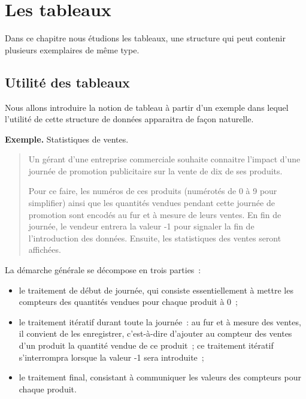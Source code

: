 \chapter{Les tableaux}
\label{chap:tableaux}

	Dans ce chapitre nous étudions les tableaux, une structure qui peut contenir
	plusieurs exemplaires de même type.

	\minitoc
	\clearpage
	\section{Utilité des tableaux}
	
		Nous allons introduire la notion de tableau à partir d’un exemple 
		dans lequel l’utilité de cette structure de données 
		apparaitra de façon naturelle.
	
		\textbf{Exemple.}
		Statistiques de ventes.
		\begin{quote}	
		
			Un gérant d’une entreprise commerciale souhaite connaitre l’impact
			d’une journée de promotion publicitaire sur la vente de dix de ses
			produits.  
			
			Pour ce faire, les numéros de ces produits (numérotés de
			0 à 9 pour simplifier) ainsi que les quantités vendues pendant cette
			journée de promotion sont encodés au fur et à mesure de leurs
			ventes.  En fin de journée, le vendeur entrera la valeur -1 pour
			signaler la fin de l’introduction des données.  Ensuite, les
			statistiques des ventes seront affichées.
		
		\end{quote}

		La démarche générale se décompose en trois parties~:
		\begin{itemize}
		
			\item le traitement de début de journée, qui consiste
				essentiellement à mettre les compteurs des quantités vendues
				pour chaque produit à 0~;
		
			\item le traitement itératif durant toute la journée~: au fur et
				à mesure des ventes, il convient de les enregistrer,
				c’est-à-dire d’ajouter au compteur des ventes d’un produit la
				quantité vendue de ce produit~; ce traitement itératif
				s’interrompra lorsque la valeur -1 sera introduite~;
		
			\item le traitement final, consistant à communiquer les valeurs des
				compteurs pour chaque produit.
		
	\end{itemize}
	
